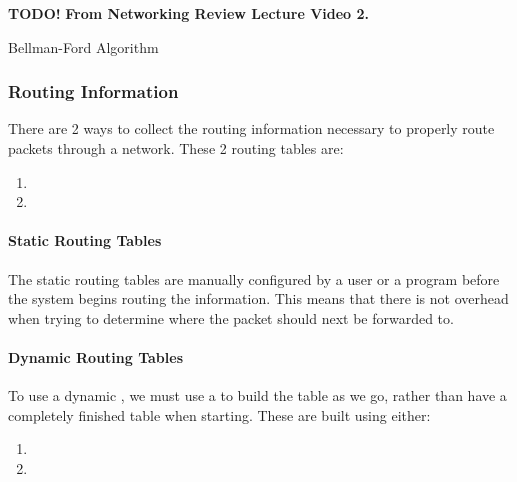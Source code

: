 \begin{algorithm}[H]
  \DontPrintSemicolon{}
  \BlankLine{}

  \textbf{TODO!} \;
  \textbf{From Networking Review Lecture Video 2.} \;

  \caption{Bellman-Ford Algorithm}
  \label{algo:Bellman_Ford_Algorithm}
\end{algorithm}

\subsubsection{Routing Information}\label{subsubsec:Routing_Info}
There are 2 ways to collect the routing information necessary to properly route packets through a network.
These 2 routing tables are:
\begin{enumerate}[noitemsep]
\item {}
\item {}
\end{enumerate}

\paragraph{Static Routing Tables}\label{par:Static_Routing_Tables}
The static routing tables are manually configured by a user or a program before the system begins routing the information.
This means that there is not overhead when trying to determine where the packet should next be forwarded to.

\paragraph{Dynamic Routing Tables}\label{par:Dynamic_Routing_Tables}
To use a dynamic , we must use a  to build the table as we go, rather than have a completely finished table when starting.
These are built using either:
\begin{enumerate}[noitemsep]
\item {}
\item {}
\end{enumerate}

